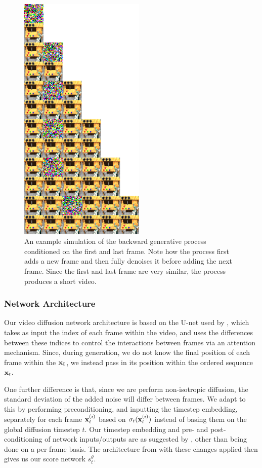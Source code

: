 \begin{figure}
    \centering
    \includegraphics[width=6cm]{figs/tddm/short-obs-32.png}
    \caption{An example simulation of the backward generative process conditioned on the first and last frame. Note how the process first adds a new frame and then fully denoises it before adding the next frame. Since the first and last frame are very similar, the process produces a short video.}
    \label{fig:tddm-examplevideoreverse}
\end{figure}




\subsubsection{Network Architecture}
Our video diffusion network architecture is based on the U-net used by \cite{harvey2022flexible}, which takes as input the index of each frame within the video, and uses the differences between these indices to control the interactions between frames via an attention mechanism. Since, during generation, we do not know the final position of each frame within the ${\mathbf{x}}_0$, we instead pass in its position within the ordered sequence ${\mathbf{x}}_t$.

One further difference is that, since we are perform non-isotropic diffusion, the standard deviation of the added noise will differ between frames. We adapt to this by performing preconditioning, and inputting the timestep embedding, separately for each frame ${\mathbf{x}}_t^{(i)}$ based on $\sigma_t({\mathbf{x}}_t^{(i)})$ instead of basing them on the global diffusion timestep $t$. Our timestep embedding and pre- and post-conditioning of network inputs/outputs are as suggested by \cite{karras2022elucidating}, other than being done on a per-frame basis. The architecture from \cite{harvey2022flexible} with these changes applied then gives us our score network $s_t^\theta$.

